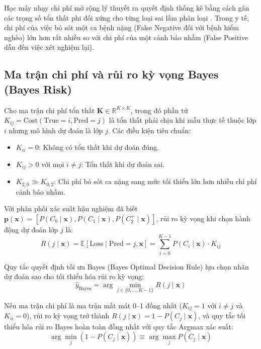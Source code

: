 Học máy nhạy chi phí mở rộng lý thuyết ra quyết định thống kê bằng cách gán các trọng số tổn thất phi đối xứng cho từng loại sai lầm phân loại \cite{elkan2001foundations}. Trong y tế, chi phí của việc bỏ sót một ca bệnh nặng (False Negative đối với bệnh hiểm nghèo) lớn hơn rất nhiều so với chi phí của một cảnh báo nhầm (False Positive dẫn đến việc xét nghiệm lại).

\subsection{Ma trận chi phí và rủi ro kỳ vọng Bayes (Bayes Risk)}
Cho ma trận chi phí tổn thất $\mathbf{K} \in \mathbb{R}^{K \times K}$, trong đó phần tử $K_{ij} = \text{Cost}(\text{True} = i, \text{Pred} = j)$ là tổn thất phải chịu khi mẫu thực tế thuộc lớp $i$ nhưng mô hình dự đoán là lớp $j$. Các điều kiện tiêu chuẩn:
\begin{itemize}
    \item $K_{ii} = 0$: Không có tổn thất khi dự đoán đúng.
    \item $K_{ij} > 0$ với mọi $i \ne j$: Tổn thất khi dự đoán sai.
    \item $K_{2,0} \gg K_{0,2}$: Chi phí bỏ sót ca nặng sang mức tối thiểu lớn hơn nhiều chi phí cảnh báo nhầm.
\end{itemize}

Với phân phối xác suất hậu nghiệm đã biết $\mathbf{p}(\mathbf{x}) = [P(C_0 \mid \mathbf{x}), P(C_1 \mid \mathbf{x}), P(C_2^+ \mid \mathbf{x})]$, rủi ro kỳ vọng khi chọn hành động dự đoán lớp $j$ là:
\begin{equation}
    R(j \mid \mathbf{x}) = \mathbb{E}[\text{Loss} \mid \text{Pred}=j, \mathbf{x}] = \sum_{i=0}^{K-1} P(C_i \mid \mathbf{x}) \cdot K_{ij}
\end{equation}

Quy tắc quyết định tối ưu Bayes (Bayes Optimal Decision Rule) lựa chọn nhãn dự đoán sao cho tối thiểu hóa rủi ro kỳ vọng:
\begin{equation}
    \hat{y}_{\text{Bayes}} = \arg\min_{j \in \{0, \dots, K-1\}} R(j \mid \mathbf{x})
\end{equation}

Nếu ma trận chi phí là ma trận mất mát 0--1 đồng nhất ($K_{ij} = 1$ với $i \ne j$ và $K_{ii} = 0$), rủi ro kỳ vọng trở thành $R(j \mid \mathbf{x}) = 1 - P(C_j \mid \mathbf{x})$, và quy tắc tối thiểu hóa rủi ro Bayes hoàn toàn đồng nhất với quy tắc Argmax xác suất:
\begin{equation}
    \arg\min_j (1 - P(C_j \mid \mathbf{x})) \equiv \arg\max_j P(C_j \mid \mathbf{x})
\end{equation}

